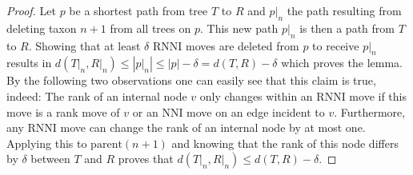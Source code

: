\documentclass{amsart}
\newcommand{\parent}{\mathrm{parent}}
\newcommand{\nni}{\mathrm{NNI}}
\newcommand{\rnni}{\mathrm{RNNI}}
\begin{document}
\begin{proof}
    Let $p$ be a shortest path from tree $T$ to $R$ and $p{\big|}_n$ the path resulting from deleting taxon $n+1$ from all trees on $p$.
    This new path $p{\big|}_n$ is then a path from $T$ to $R$.
    Showing that at least $\delta$ $\rnni$ moves are deleted from $p$ to receive $p{\big|}_n$ results in $d(T{\big|}_n,R{\big|}_n) \leq |p{\big|}_n| \leq |p| - \delta = d(T,R) -\delta$ which proves the lemma.
    By the following two observations one can easily see that this claim is true, indeed:
    The rank of an internal node $v$ only changes within an $\rnni$ move if this move is a rank move of $v$ or an $\nni$ move on an edge incident to $v$.
    Furthermore, any $\rnni$ move can change the rank of an internal node by at most one.
    Applying this to $\parent(n+1)$ and knowing that the rank of this node differs by $\delta$ between $T$ and $R$ proves that $d(T{\big|}_n, R{\big|}_n) \leq d(T,R) - \delta$.


\end{proof}
\end{document}
